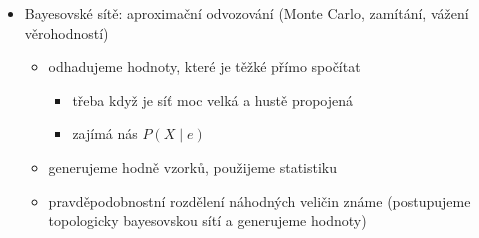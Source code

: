 \begin{itemize}
\begin{itemize}
\item $P(X\mid e)=\alpha P(X,e)=\alpha\sum_y P(X,e,y)$
\begin{itemize}
\item kde pravděpodobnost $X$ odvozujeme, $e$ jsou pozorované proměnné (evidence) a $y$ jsou hodnoty další skryté proměnné $Y$
\end{itemize}
\item přičemž $P(X,e,y)$ lze určit pomocí CPD tabulek
\begin{itemize}
\item když nemůžeme určit konkrétní hodnotu pravděpodobnosti přímo, tak výpočet rozvětvíme
\item některé větve se objeví vícekrát - hodí se nám dynamické programování
\end{itemize}
\item používáme \textit{faktory} (tabulky odpovídající CPD tabulkám)
\begin{itemize}
\item tabulky s faktory mezi sebou můžeme násobit
\item eliminace
\begin{itemize}
\item mějme faktor s pravděpodobnostmi $P(A,B,C)$ pro všechny možné kombinace hodnot proměnných
\item můžeme ho rozdělit na dvě půlky (v jedné bude všude platit $A$, v druhé $\neg A$)
\item tyhle dvě půlky můžeme sečíst (vždy odpovídající řádky)
\item tak eliminujeme proměnnou $A$, dostaneme faktor s pravděpodobnostmi $P(B,C)$
\end{itemize}
\end{itemize}
\end{itemize}
\item Bayesovské sítě: aproximační odvozování (Monte Carlo, zamítání, vážení věrohodností)
\begin{itemize}
\item odhadujeme hodnoty, které je těžké přímo spočítat
\begin{itemize}
\item třeba když je síť moc velká a hustě propojená
\item zajímá nás $P(X\mid e)$
\end{itemize}
\item generujeme hodně vzorků, použijeme statistiku
\item pravděpodobnostní rozdělení náhodných veličin známe (postupujeme topologicky bayesovskou sítí a generujeme hodnoty)

\end{itemize}
\end{itemize}
